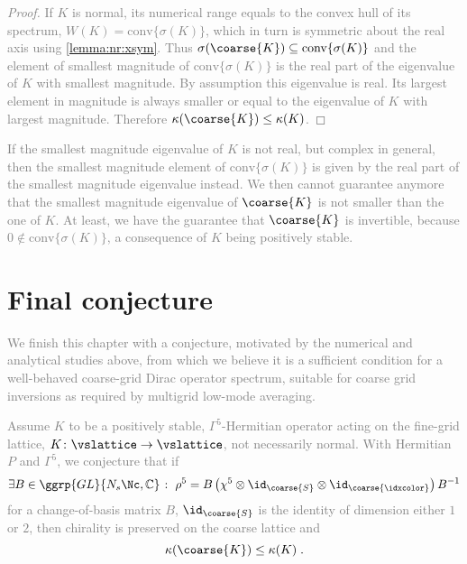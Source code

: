 \textcolor{gray}{
\begin{proof}
If $K$ is normal, its numerical range equals to the convex hull of its spectrum, $W(K) = \text{conv}\{\sigma(K)\}$, which in turn is symmetric about the real axis using \cref{lemma:nr:xsym}.
Thus $\sigma(\coarse{K}) \subseteq \text{conv}\{\sigma(K)\}$ and the element of smallest magnitude of $\text{conv}\{\sigma(K)\}$ is the real part of the eigenvalue of $K$ with smallest magnitude.
By assumption this eigenvalue is real.
Its largest element in magnitude is always smaller or equal to the eigenvalue of $K$ with largest magnitude.
Therefore $\kappa(\coarse{K}) \leq \kappa(K)$.
\end{proof}
}

\textcolor{gray}{
If the smallest magnitude eigenvalue of $K$ is not real, but complex in general, then the smallest magnitude element of $\text{conv}\{\sigma(K)\}$ is given by the real part of the smallest magnitude eigenvalue instead.
We then cannot guarantee anymore that the smallest magnitude eigenvalue of $\coarse{K}$ is not smaller than the one of $K$.
At least, we have the guarantee that $\coarse{K}$ is invertible, because $0 \not\in \text{conv}\{\sigma(K)\}$, a consequence of $K$ being positively stable.
}

\section{Final conjecture}

\textcolor{gray}{
We finish this chapter with a conjecture, motivated by the numerical and analytical studies above, from which we believe it is a sufficient condition for a well-behaved coarse-grid Dirac operator spectrum, suitable for coarse grid inversions as required by multigrid low-mode averaging.
\begin{conj}
Assume $K$ to be a positively stable, $\Gamma^{5}$-Hermitian operator acting on the fine-grid lattice, $K \colon \vslattice \rightarrow \vslattice$, not necessarily normal.
With Hermitian $P$ and $\Gamma^{5}$, we conjecture that if
\begin{equation} \label{eq:conj:chi}
\exists B \in \ggrp{GL}{N_s \Nc, \mathbb{C}} \; \colon \; \rho^5 = B \left( \chi^{5} \otimes \id_{\coarse{S}} \otimes \id_{\coarse{\idxcolor}} \right) B^{-1}
\end{equation}
for a change-of-basis matrix $B$, $\id_{\coarse{S}}$ is the identity of dimension either $1$ or $2$,
then chirality is preserved on the coarse lattice and
\begin{equation}
\kappa(\coarse{K}) \leq \kappa(K) \;.
\end{equation}
\end{conj}
}

